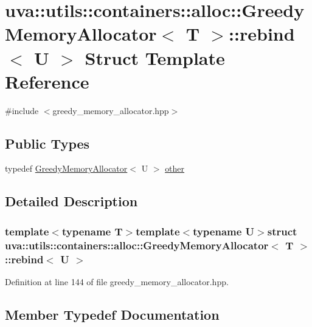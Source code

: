 \hypertarget{structuva_1_1utils_1_1containers_1_1alloc_1_1_greedy_memory_allocator_1_1rebind}{}\section{uva\+:\+:utils\+:\+:containers\+:\+:alloc\+:\+:Greedy\+Memory\+Allocator$<$ T $>$\+:\+:rebind$<$ U $>$ Struct Template Reference}
\label{structuva_1_1utils_1_1containers_1_1alloc_1_1_greedy_memory_allocator_1_1rebind}


{\ttfamily \#include $<$greedy\+\_\+memory\+\_\+allocator.\+hpp$>$}

\subsection*{Public Types}
\begin{DoxyCompactItemize}
\item 
typedef \hyperlink{classuva_1_1utils_1_1containers_1_1alloc_1_1_greedy_memory_allocator}{Greedy\+Memory\+Allocator}$<$ U $>$ \hyperlink{structuva_1_1utils_1_1containers_1_1alloc_1_1_greedy_memory_allocator_1_1rebind_a4c67e954f2b6eb5b5eaae098fe09ef0a}{other}
\end{DoxyCompactItemize}


\subsection{Detailed Description}
\subsubsection*{template$<$typename T$>$template$<$typename U$>$struct uva\+::utils\+::containers\+::alloc\+::\+Greedy\+Memory\+Allocator$<$ T $>$\+::rebind$<$ U $>$}



Definition at line 144 of file greedy\+\_\+memory\+\_\+allocator.\+hpp.



\subsection{Member Typedef Documentation}
\hypertarget{structuva_1_1utils_1_1containers_1_1alloc_1_1_greedy_memory_allocator_1_1rebind_a4c67e954f2b6eb5b5eaae098fe09ef0a}{}
